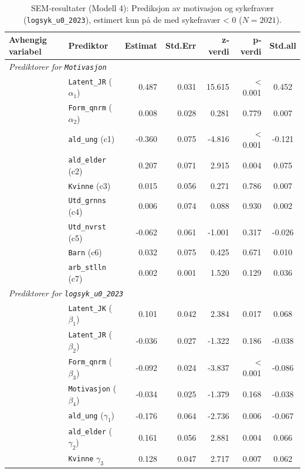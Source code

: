 \documentclass[
  12pt,
  a4paper,
  DIV=11,
  numbers=noendperiod]{scrartcl}
\begin{document}
\begin{table}[htbp]
\centering
\caption{SEM‐resultater (Modell 4): Prediksjon av motivasjon og sykefravær (\texttt{logsyk\_u0\_2023}), estimert kun på de med sykefravær < 0 ($N = 2021$).}
\label{tab:sem_results_model4}
\begin{tabular}{@{}llrrrrc@{}}
\toprule
Avhengig variabel & Prediktor & Estimat & Std.Err & z‐verdi & p‐verdi & Std.all \\
\midrule
\multicolumn{7}{l}{\textit{Prediktorer for \texttt{Motivasjon}}} \\
& \texttt{Latent\_JR} ($\alpha_1$)        & 0.487 & 0.031 & 15.615 & < 0.001 & 0.452 \\
& \texttt{Form\_qnrm} ($\alpha_2$)        & 0.008 & 0.028 & 0.281  & 0.779   & 0.007 \\
& \texttt{ald\_ung} (c1)          & -0.360& 0.075 & -4.816 & < 0.001 & -0.121 \\
& \texttt{ald\_elder} (c2)        & 0.207 & 0.071 & 2.915  & 0.004   & 0.075 \\
& \texttt{Kvinne} (c3)            & 0.015 & 0.056 & 0.271  & 0.786   & 0.007 \\
& \texttt{Utd\_grnns} (c4)        & 0.006 & 0.074 & 0.088  & 0.930   & 0.002 \\
& \texttt{Utd\_nvrst} (c5)        & -0.062& 0.061 & -1.001 & 0.317   & -0.026 \\
& \texttt{Barn} (c6)              & 0.032 & 0.075 & 0.425  & 0.671   & 0.010 \\
& \texttt{arb\_stlln} (c7)        & 0.002 & 0.001 & 1.520  & 0.129   & 0.036 \\
\midrule
\multicolumn{7}{l}{\textit{Prediktorer for \texttt{logsyk\_u0\_2023}}} \\
& \texttt{Latent\_JK} ($\beta_1$)        & 0.101 & 0.042 & 2.384  & 0.017   & 0.068 \\
& \texttt{Latent\_JR} ($\beta_2$)        & -0.036& 0.027 & -1.322 & 0.186   & -0.038 \\
& \texttt{Form\_qnrm} ($\beta_3$)        & -0.092& 0.024 & -3.837 & < 0.001 & -0.086 \\
& \texttt{Motivasjon} ($\beta_4$)        & -0.034& 0.025 & -1.379 & 0.168   & -0.038 \\
& \texttt{ald\_ung} ($\gamma_1$)          & -0.176& 0.064 & -2.736 & 0.006   & -0.067 \\
& \texttt{ald\_elder} ($\gamma_2$)        & 0.161 & 0.056 & 2.881  & 0.004   & 0.066 \\
& \texttt{Kvinne} $\gamma_3$            & 0.128 & 0.047 & 2.717  & 0.007   & 0.062 \\

\end{tabular}
\end{table}
\end{document}
